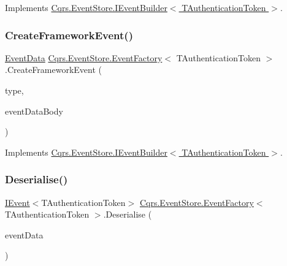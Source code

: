 Implements \hyperlink{interfaceCqrs_1_1EventStore_1_1IEventBuilder_a341d5c54ef8a271a8248e0a5266e6228}{Cqrs.\+Event\+Store.\+I\+Event\+Builder$<$ T\+Authentication\+Token $>$}.

\mbox{\label{classCqrs_1_1EventStore_1_1EventFactory_a9e04e262a8af8f60bdde7b4bf3eafebb}} 
\subsubsection{\texorpdfstring{Create\+Framework\+Event()}{CreateFrameworkEvent()}\hspace{0.1cm}{\footnotesize\ttfamily [4/4]}}
{\footnotesize\ttfamily \hyperlink{classCqrs_1_1Events_1_1EventData}{Event\+Data} \hyperlink{classCqrs_1_1EventStore_1_1EventFactory}{Cqrs.\+Event\+Store.\+Event\+Factory}$<$ T\+Authentication\+Token $>$.Create\+Framework\+Event (\begin{DoxyParamCaption}\item[{string}]{type,  }\item[{string}]{event\+Data\+Body }\end{DoxyParamCaption})}



Implements \hyperlink{interfaceCqrs_1_1EventStore_1_1IEventBuilder_a8e3df7af1f54ac873d1a768b78b82c6d}{Cqrs.\+Event\+Store.\+I\+Event\+Builder$<$ T\+Authentication\+Token $>$}.

\mbox{\label{classCqrs_1_1EventStore_1_1EventFactory_abfd04f6833e4f010234d84a591f6eb6b}} 
\subsubsection{\texorpdfstring{Deserialise()}{Deserialise()}\hspace{0.1cm}{\footnotesize\ttfamily [1/2]}}
{\footnotesize\ttfamily \hyperlink{interfaceCqrs_1_1Events_1_1IEvent}{I\+Event}$<$T\+Authentication\+Token$>$ \hyperlink{classCqrs_1_1EventStore_1_1EventFactory}{Cqrs.\+Event\+Store.\+Event\+Factory}$<$ T\+Authentication\+Token $>$.Deserialise (\begin{DoxyParamCaption}\item[{Recorded\+Event}]{event\+Data }\end{DoxyParamCaption})}



